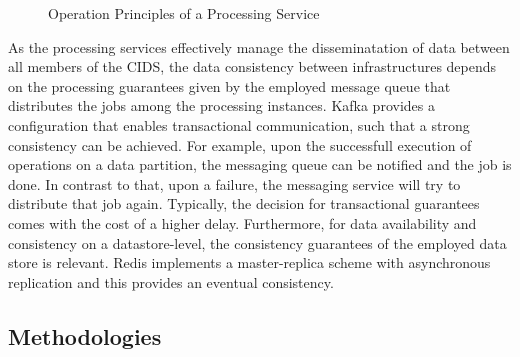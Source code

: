 \documentclass[../../main.tex]{subfiles}
\begin{document}
\begin{figure}[b!]
    \centering
    
    \caption[Implementation Details]{Operation Principles of a Processing Service}  \label{fig:implementation}
 \end{figure}

As the processing services effectively manage the disseminatation of data between all members of the CIDS, the data consistency between infrastructures depends on the processing guarantees given by the employed message queue that distributes the jobs among the processing instances. Kafka provides a configuration that enables transactional communication, such that a strong consistency can be achieved. For example, upon the successfull execution of operations on a data partition, the messaging queue can be notified and the job is done. In contrast to that, upon a failure, the messaging service will try to distribute that job again. Typically, the decision for transactional guarantees comes with the cost of a higher delay. Furthermore, for data availability and consistency on a datastore-level, the consistency guarantees of the employed data store is relevant. Redis implements a master-replica scheme with asynchronous replication and this provides an eventual consistency.




\subsection{Methodologies}\label{subsec:methodologies}


\end{document}
